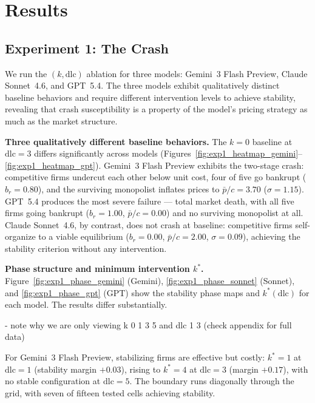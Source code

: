 \section{Results}
\label{results}


\subsection{Experiment 1: The Crash}
\label{results:crash}
We run the $(k, \mathrm{dlc})$ ablation for three models: Gemini~3 Flash Preview,
Claude Sonnet~4.6, and GPT~5.4. The three models exhibit qualitatively distinct
baseline behaviors and require different intervention levels to achieve stability,
revealing that crash susceptibility is a property of the model's pricing strategy as
much as the market structure.

\textbf{Three qualitatively different baseline behaviors.}
The $k=0$ baseline at $\mathrm{dlc}=3$ differs significantly across models
(Figures~\ref{fig:exp1_heatmap_gemini}--\ref{fig:exp1_heatmap_gpt}).
Gemini~3 Flash Preview exhibits the two-stage crash: competitive firms
undercut each other below unit cost, four of five go bankrupt ($b_r = 0.80$), and the
surviving monopolist inflates prices to $\bar{p}/c = 3.70$ ($\sigma = 1.15$).
GPT~5.4 produces the most severe failure --- total market death, with all five firms
going bankrupt ($b_r = 1.00$, $\bar{p}/c = 0.00$) and no surviving monopolist at all.
Claude Sonnet~4.6, by contrast, does not crash at baseline: competitive firms
self-organize to a viable equilibrium ($b_r = 0.00$, $\bar{p}/c = 2.00$,
$\sigma = 0.09$), achieving the stability criterion without any intervention. 

\textbf{Phase structure and minimum intervention $k^*$.}
Figure~\ref{fig:exp1_phase_gemini} (Gemini), \ref{fig:exp1_phase_sonnet} (Sonnet),
and \ref{fig:exp1_phase_gpt} (GPT) show the stability phase maps and $k^*(\mathrm{dlc})$
for each model. The results differ substantially.

- note why we are only viewing k 0 1 3 5 and dlc 1 3 (check appendix for full data)

For Gemini~3 Flash Preview, stabilizing firms are effective but costly: $k^* = 1$ at
$\mathrm{dlc}=1$ (stability margin $+0.03$), rising to $k^* = 4$ at $\mathrm{dlc}=3$
(margin $+0.17$), with no stable configuration at $\mathrm{dlc}=5$. The boundary runs diagonally through the grid, with seven of fifteen tested cells
achieving stability.

